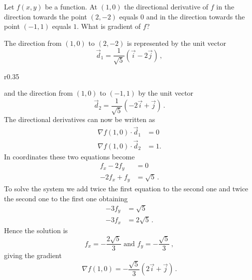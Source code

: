 \begin{question}
Let $f(x,y)$ be a function. At $(1,0)$ the directional derivative of $f$ in the direction towards the point $(2,-2)$ equals $0$ and in the direction towards the point $(-1,1)$ equals $1$. What is gradient of $f$?
\end{question}

\begin{solution}
The direction from $(1,0)$ to $(2,-2)$ is
represented by the unit vector
\[
\vec d_1 = \frac 1{\sqrt{5}}\left(\vec i - 2\vec j \right)\,,
\]
\begin{wrapfigure}{r}{0.35\textwidth}
\centering
\end{wrapfigure}
and the direction from $(1,0)$ to $(-1,1)$ by the unit vector
\[
\vec d_2 = \frac 1{\sqrt{5}}\left(-2 \vec i + \vec j\right)\,.
\]
The directional derivatives can now be written as
\begin{align*}
\nabla f(1,0) \cdot \vec d_1 &= 0 \\
\nabla f(1,0) \cdot \vec d_2 &= 1.
\end{align*}
In coordinates these two equations become
\begin{align*}
f_x - 2f_y &= 0 \\
-2f_x + f_y &= \sqrt{5}\,.
\end{align*}
To solve the system we add twice the first equation to the second one and twice the second one to the first one obtaining
\begin{align*}
- 3f_y &= \sqrt{5} \\
-3f_x  &= 2\sqrt{5}\,.
\end{align*}
Hence the solution is
\[
f_x = -\frac {2\sqrt{5}}{3} \text{ and } f_y = -\frac {\sqrt{5}}{3}\,,
\]
giving the gradient
\[
\nabla f(1,0) = -\frac{\sqrt{5}}{3} \left( 2\vec i + \vec j\right)\,.
\]
\end{solution}


